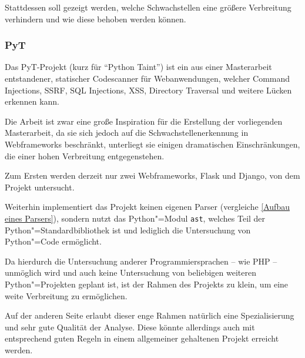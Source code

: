             Stattdessen soll gezeigt werden,
            welche Schwachstellen eine größere Verbreitung verhindern und
            wie diese behoben werden können.

            \subsubsection{PyT}
                Das PyT-Projekt
                (kurz für
                \foreignquote{english}{Python Taint}) ist ein aus einer Masterarbeit\cite{Micheelsen2016} entstandener,
                statischer Codescanner für Webanwendungen,
                welcher Command Injections,
                \gls{SSRF},
                \gls{SQL} Injections,
                \gls{XSS},
                Directory Traversal und weitere Lücken erkennen kann.

                Die Arbeit ist zwar eine große Inspiration für die Erstellung der vorliegenden Masterarbeit,
                da sie sich jedoch auf die Schwachstellenerkennung in Webframeworks beschränkt,
                unterliegt sie einigen dramatischen Einschränkungen,
                die einer hohen Verbreitung entgegenstehen.

                Zum Ersten werden derzeit nur zwei Webframeworks,
                Flask\cite{Ronacher2018} und
                Django\cite{DSF2018},
                von dem Projekt untersucht.

                Weiterhin implementiert das Projekt keinen eigenen Parser
                (vergleiche
                \vref{Aufbau eines Parsers}),
                sondern nutzt das Python"=Modul
                \texttt{ast}\cite{PSF2018},
                welches Teil der Python"=Standardbibliothek ist und
                lediglich die Untersuchung von Python"=Code ermöglicht.

                Da hierdurch die Untersuchung anderer Programmiersprachen
                -- wie
                \gls{PHP}
                -- unmöglich wird und
                auch keine Untersuchung von beliebigen weiteren Python"=Projekten geplant ist,
                ist der Rahmen des Projekts zu klein,
                um eine weite Verbreitung zu ermöglichen.

                Auf der anderen Seite erlaubt dieser enge Rahmen natürlich eine Spezialisierung und
                sehr gute Qualität der Analyse.
                Diese könnte allerdings auch mit entsprechend guten Regeln in einem allgemeiner gehaltenen Projekt erreicht werden.

